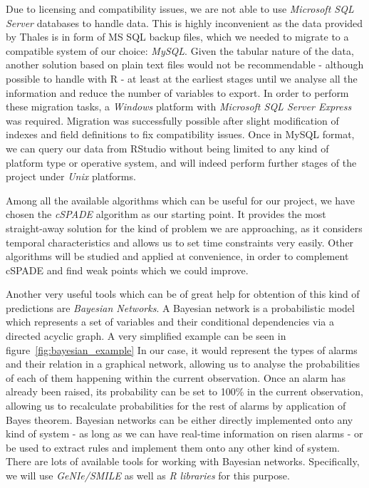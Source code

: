 \documentclass[a4paper,12pt]{article}
\begin{document}
Due to licensing and compatibility issues, we are not able to use \emph{Microsoft SQL Server} databases to handle data. This is highly inconvenient as the data provided by Thales is in form of MS SQL backup files, which we needed to migrate to a compatible system of our choice: \emph{MySQL}. Given the tabular nature of the data, another solution based on plain text files would not be recommendable - although possible to handle with R - at least at the earliest stages until we analyse all the information and reduce the number of variables to export. In order to perform these migration tasks, a \emph{Windows} platform with \emph{Microsoft SQL Server Express} was required. Migration was successfully possible after slight modification of indexes and field definitions to fix compatibility issues. Once in MySQL format, we can query our data from RStudio without being limited to any kind of platform type or operative system, and will indeed perform further stages of the project under \emph{Unix} platforms.

Among all the available algorithms which can be useful for our project, we have chosen the \emph{cSPADE} algorithm\cite{zaki2001spade} as our starting point. It provides the most straight-away solution for the kind of problem we are approaching, as it considers temporal characteristics and allows us to set time constraints very easily. Other algorithms will be studied and applied at convenience, in order to complement cSPADE and find weak points which we could improve.

Another very useful tools which can be of great help for obtention of this kind of predictions are \emph{Bayesian Networks}\cite{jensen1996introduction}. A Bayesian network is a probabilistic model which represents a set of variables and their conditional dependencies via a directed acyclic graph. A very simplified example can be seen in figure~\ref{fig:bayesian_example} In our case, it would represent the types of alarms and their relation in a graphical network, allowing us to analyse the probabilities of each of them happening within the current observation. Once an alarm has already been raised, its probability can be set to 100\% in the current observation, allowing us to recalculate probabilities for the rest of alarms by application of Bayes theorem. Bayesian networks can be either directly implemented onto any kind of system - as long as we can have real-time information on risen alarms - or be used to extract rules and implement them onto any other kind of system. There are lots of available tools for working with Bayesian networks. Specifically, we will use \emph{GeNIe/SMILE}\cite{druzdzel1999smile} as well as \emph{R libraries} for this purpose.
\end{document}

